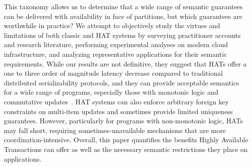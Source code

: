 This taxonomy allows us to determine that a wide range of semantic
guarantees can be delivered with availability in face of partitions,
but which guarantees are worthwhile in practice? We attempt to
objectively study the virtues and limitations of both classic and HAT
systems by surveying practitioner accounts and research literature,
performing experimental analyses on modern cloud infrastructure, and
analyzing representative applications for their semantic
requirements. While our results are not definitive, they suggest that
HATs offer a one to three order of magnitude latency decrease compared
to traditional distributed serializability protocols, and they can
provide acceptable semantics for a wide range of programs, especially
those with monotonic logic and commutative updates~\cite{calm, blooml,
  crdt}. HAT systems can also enforce arbitrary foreign key
constraints on multi-item updates and sometimes provide limited
uniqueness guarantees. However, particularly for programs with
non-monotonic logic, HATs may fall short, requiring
sometimes-unavailable mechanisms that are more
coordination-intensive. Overall, this paper quantifies the benefits
Highly Available Transactions can offer as well as the necessary
semantic restrictions they place on applications.




